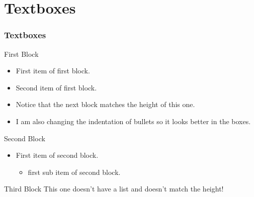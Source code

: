 \documentclass[
	11pt, %
	aspectratio=169, %
]{beamer}
\begin{document}
\section{Textboxes}
\begin{frame}
  \frametitle{Textboxes}
  \centering
  \begin{minipage}{0.3\linewidth}
    \begin{primaryblock}[equal height group=A,label=block:first]{First Block}
    \setlength{\leftmargini}{8pt}
    \begin{itemize}
      \item First item of first block.
      \item Second item of first block.
      \item Notice that the next block matches the height of this one.
      \item I am also changing the indentation of bullets so it looks better in the boxes.
    \end{itemize}
    \end{primaryblock}
  \end{minipage}
  \begin{minipage}{0.3\linewidth}
    \begin{secondaryblock}[equal height group=A]{Second Block}
      \setlength{\leftmargini}{8pt}
      \begin{itemize}
        \item First item of second block.
        \begin{itemize}
          \item first sub item of second block.
        \end{itemize}
      \end{itemize}
    \end{secondaryblock}
  \end{minipage}
  \begin{minipage}{0.3\linewidth}
    \begin{primaryblock}[]{Third Block}
        This one doesn't have a list and doesn't match the height!
    \end{primaryblock}
  \end{minipage}
\end{frame}
\end{document}

